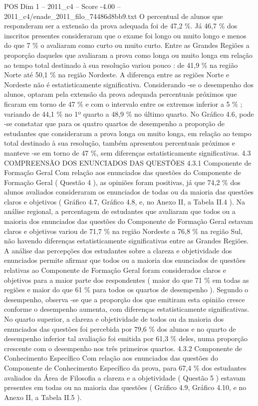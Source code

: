\begin{textsample}{POS Dim 1 – 2011\_c4 – Score -4.00 – 2011\_c4/enade\_2011\_filo\_74486d8bb9.txt}
O percentual de alunos que responderam ser a extensão da prova adequada foi de 47,2 \%.
Já 46,7 \% dos inscritos presentes consideraram que o exame foi longo ou muito longo e menos do que 7 \% o avaliaram como curto ou muito curto.
Entre as Grandes Regiões a proporção daqueles que avaliaram a prova como longa ou muito longa em relação ao tempo total destinado à sua resolução variou pouco : de 41,9 \% na região Norte até 50,1 \% na região Nordeste.
A diferença entre as regiões Norte e Nordeste não é estatisticamente significativa.
Considerando -se o desempenho dos alunos, optaram pela extensão da prova adequada percentuais próximos que ficaram em torno de 47 \% e com o intervalo entre os extremos inferior a 5 \% ; variando de 44,1 \% no 1º quarto a 48,9 \% no último quarto.
No Gráfico 4.6, pode -se constatar que para os quatro quartos de desempenho a proporção de estudantes que consideraram a prova longa ou muito longa, em relação ao tempo total destinado à sua resolução, também apresentou percentuais próximos e manteve -se em torno de 47 \%, sem diferenças estatisticamente significativas. 4.3 COMPREENSÃO DOS ENUNCIADOS DAS QUESTÕES 4.3.1 Componente de Formação Geral Com relação aos enunciados das questões do Componente de Formação Geral ( Questão 4 ), as opiniões foram positivas, já que 74,2 \% dos alunos avaliados consideraram os enunciados de todas ou da maioria das questões claros e objetivos ( Gráfico 4.7, Gráfico 4.8, e, no Anexo II, a Tabela II.4 ).
Na análise regional, a percentagem de estudantes que avaliaram que todos ou a maioria dos enunciados das questões do Componente de Formação Geral estavam claros e objetivos variou de 71,7 \% na região Nordeste a 76,8 \% na região Sul, não havendo diferenças estatisticamente significativas entre as Grandes Regiões.
A análise das percepções dos estudantes sobre a clareza e objetividade dos enunciados permite afirmar que todos ou a maioria dos enunciados de questões relativas ao Componente de Formação Geral foram considerados claros e objetivos para a maior parte dos respondentes ( maior do que 71 \% em todas as regiões e maior do que 61 \% para todos os quartos de desempenho ).
Segundo o desempenho, observa -se que a proporção dos que emitiram esta opinião cresce conforme o desempenho aumenta, com diferenças estatisticamente significativas.
No quarto superior, a clareza e objetividade de todos ou da maioria dos enunciados das questões foi percebida por 79,6 \% dos alunos e no quarto de desempenho inferior tal avaliação foi emitida por 61,3 \% deles, numa proporção crescente com o desempenho nos três primeiros quartos. 4.3.2 Componente de Conhecimento Específico Com relação aos enunciados das questões do Componente de Conhecimento Específico da prova, para 67,4 \% dos estudantes avaliados da Área de Filosofia a clareza e a objetividade ( Questão 5 ) estavam presentes em todas ou na maioria das questões ( Gráfico 4.9, Gráfico 4.10, e no Anexo II, a Tabela II.5 ).

\end{textsample}
